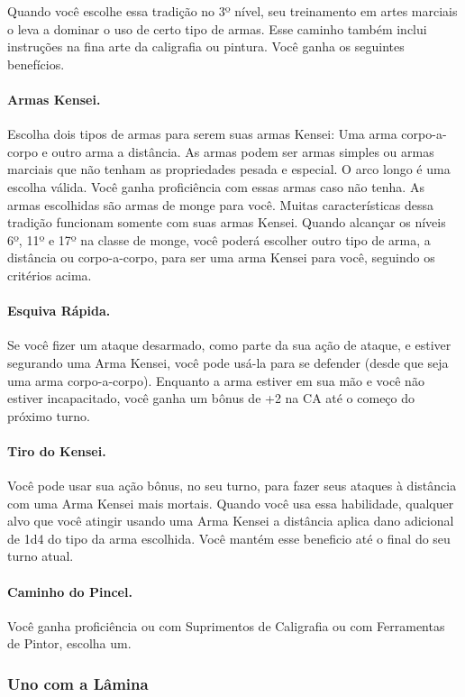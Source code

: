 \begin{multicols}{2}
Quando você escolhe essa tradição no 3º nível, seu treinamento em artes marciais
o leva a dominar o uso de certo tipo de armas. Esse caminho também inclui
instruções na fina arte da caligrafia ou pintura. Você ganha os seguintes
benefícios.

\paragraph{Armas Kensei.}%
Escolha dois tipos de armas para serem suas armas Kensei: Uma arma corpo-a-corpo
e outro arma a distância. As armas podem ser armas simples ou armas marciais que
não tenham as propriedades pesada e especial. O arco longo é uma escolha válida.
Você ganha proficiência com essas armas caso não tenha. As armas escolhidas são
armas de monge para você. Muitas características dessa tradição funcionam
somente com suas armas Kensei. Quando alcançar os níveis 6º, 11º e 17º na
classe de monge, você poderá escolher outro tipo de arma, a distância ou
corpo-a-corpo, para ser uma arma Kensei para você, seguindo os critérios acima.

\paragraph{Esquiva Rápida.}%
Se você fizer um ataque desarmado, como parte da sua ação de ataque, e estiver
segurando uma Arma Kensei, você pode usá-la para se defender (desde que seja uma
arma corpo-a-corpo). Enquanto a arma estiver em sua mão e você não estiver
incapacitado, você ganha um bônus de +2 na CA até o começo do próximo turno.

\paragraph{Tiro do Kensei.}%
Você pode usar sua ação bônus, no seu turno, para fazer seus ataques à distância
com uma Arma Kensei mais mortais. Quando você usa essa habilidade, qualquer alvo
que você atingir usando uma Arma Kensei a distância aplica dano adicional de 1d4
do tipo da arma escolhida. Você mantém esse beneficio até o final do seu turno
atual.

\paragraph{Caminho do Pincel.}%
Você ganha proficiência ou com Suprimentos de Caligrafia ou com Ferramentas de
Pintor, escolha um.

\subsubsection*{Uno com a Lâmina}%
\label{ssub:uno_com_a_lamina}


\end{multicols}
